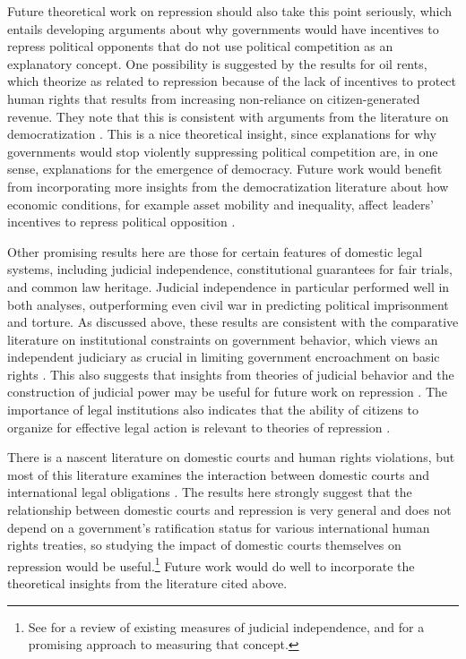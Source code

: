 \documentclass[12pt]{article}
\begin{document}
Future theoretical work on repression should also take this point seriously, which entails developing arguments about why governments would have incentives to repress political opponents that do not use political competition as an explanatory concept. One possibility is suggested by the results for oil rents, which \citet{DemerittYoung2013} theorize as related to repression because of the lack of incentives to protect human rights that results from increasing non-reliance on citizen-generated revenue. They note that this is consistent with arguments from the literature on democratization \citep[E.g.][]{Huntington1991,BDMSmith2009}. This is a nice theoretical insight, since explanations for why governments would stop violently suppressing political competition are, in one sense, explanations for the emergence of democracy. Future work would benefit from incorporating more insights from the democratization literature about how economic conditions, for example asset mobility and inequality, affect leaders' incentives to repress political opposition \citep[See, e.g.][]{Boix2003,AcemogluRobinson2005,ClarkGolderGolder2013}. 

Other promising results here are those for certain features of domestic legal systems, including judicial independence, constitutional guarantees for fair trials, and common law heritage. Judicial independence in particular performed well in both analyses, outperforming even civil war in predicting political imprisonment and torture. As discussed above, these results are consistent with the comparative literature on institutional constraints on government behavior, which views an independent judiciary as crucial in limiting government encroachment on basic rights \citep[See esp.][]{NorthWeingast1989,Weingast1997,Vanberg2005}. This also suggests that insights from theories of judicial behavior and the construction of judicial power may be useful for future work on repression \citep[See][]{Vanberg2005,Staton2006,Carrubba2009,StatonMoore2011}. The importance of legal institutions also indicates that the ability of citizens to organize for effective legal action is relevant to theories of repression \citep[See, e.g.][]{Epp1998}. 

There is a nascent literature on domestic courts and human rights violations, but most of this literature examines the interaction between domestic courts and international legal obligations \citep{Hathaway2007,PowellStaton2009,Simmons2009,Conrad2012,ConradRitter2013,Lupu2013}. The results here strongly suggest that the relationship between domestic courts and repression is very general and does not depend on a government's ratification status for various international human rights treaties, so studying the impact of domestic courts themselves on repression would be useful.\footnote{See \citet{RiosStaton2012} for a review of existing measures of judicial independence, and \citet{LinzerStaton2011} for a promising approach to measuring that concept.} Future work would do well to incorporate the theoretical insights from the literature cited above.
\end{document}
